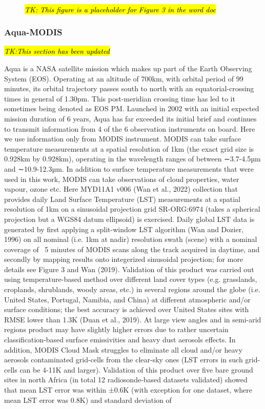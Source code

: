 \documentclass[hess, manuscript]{copernicus}
\begin{document}
\begin{figure}
	 \\
	\caption{\hl{\textit{TK: This figure is a placeholder for Figure 3 in the word doc}}} 
	\label{fig:example_figure_c}
\end{figure}


\subsubsection{Aqua-MODIS}
\hl{\textit{TK:This section has been updated}}

\noindent Aqua  \citep{aquaref} is a NASA satellite mission which makes up part of the Earth Observing System (EOS). Operating at an altitude of 700km, with orbital period of 99 minutes, its orbital trajectory passes south to north with an equatorial-crossing times in general of 1.30pm. This post-meridian crossing time has led to it sometimes being denoted as EOS PM. Launched in 2002 with an initial expected mission duration of 6 years, Aqua has far exceeded its initial brief and continues to transmit information from 4 of the 6 observation instruments on board. Here we use information only from MODIS instrument. MODIS can take surface temperature measurements at a spatial resolution of 1km (the exact grid size is 0.928km by 0.928km), operating in the wavelength ranges of between ∼3.7-4.5µm and ∼10.9-12.3µm. In addition to surface temperature measurements that were used in this work, MODIS can take observations of cloud properties, water vapour, ozone etc. Here MYD11A1 v006 (Wan et al., 2022) collection that provides daily Land Surface Temperature (LST) measurements at a spatial resolution of 1km on a sinusoidal projection grid SR-ORG:6974 (takes a spherical projection but a WGS84 datum ellipsoid) is exercised. Daily global LST data is generated by first applying a split-window LST algorithm (Wan and Dozier, 1996) on all nominal (i.e. 1km at nadir) resolution swath (scene) with a nominal coverage of ~5 minutes of MODIS scans along the track acquired in daytime, and secondly by mapping results onto integerized sinusoidal projection; for more details see Figure 3 and Wan (2019). Validation of this product was carried out using temperature-based method over different land cover types (e.g. grasslands, croplands, shrublands, woody areas, etc.) in several regions around the globe (i.e. United States, Portugal, Namibia, and China) at different atmospheric and/or surface conditions; the best accuracy is achieved over United States sites with RMSE lower than 1.3K (Duan et al., 2019). At large view angles and in semi-arid regions product may have slightly higher errors due to rather uncertain classification-based surface emissivities and heavy dust aerosols effects. In addition, MODIS Cloud Mask struggles to eliminate all cloud and/or heavy aerosols contaminated grid-cells from the clear-sky ones (LST errors in such grid-cells can be 4-11K and larger). Validation of this product over five bare ground sites in north Africa (in total 12 radiosonde-based datasets validated) showed that mean LST error was within ±0.6K (with exception for one dataset, where mean LST error was 0.8K) and standard deviation of 
\end{document}
